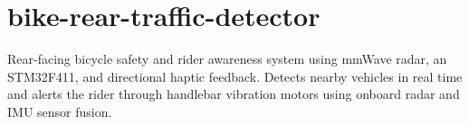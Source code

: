 \chapter{bike-\/rear-\/traffic-\/detector }
\hypertarget{md__r_e_a_d_m_e}{}\label{md__r_e_a_d_m_e}
\label{md__r_e_a_d_m_e_autotoc_md0}%
%


Rear-\/facing bicycle safety and rider awareness system using mm\+Wave radar, an STM32\+F411, and directional haptic feedback. Detects nearby vehicles in real time and alerts the rider through handlebar vibration motors using onboard radar and IMU sensor fusion. 